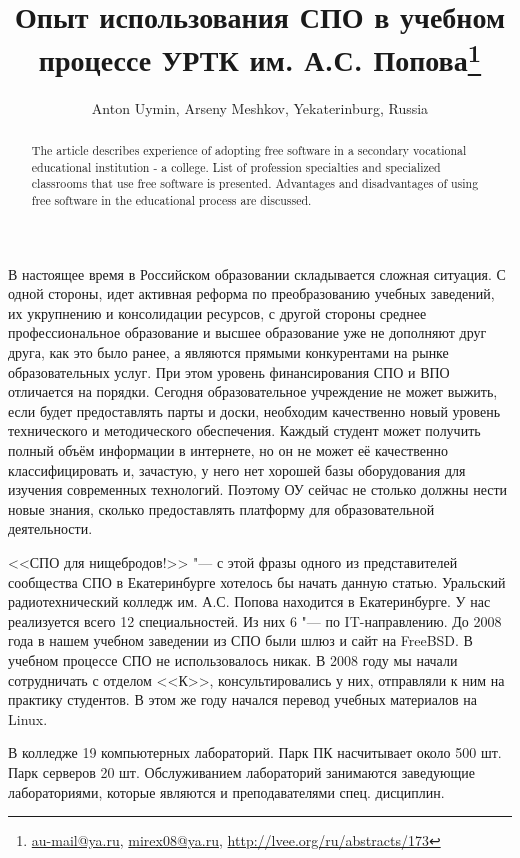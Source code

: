 \documentclass[10pt, a5paper]{article}
\begin{document}
\title{Опыт использования СПО в учебном процессе УРТК им. А.С. Попова\footnote{\url{au-mail@ya.ru}, \url{mirex08@ya.ru}, \url{http://lvee.org/ru/abstracts/173}}}
\author{Anton Uymin, Arseny Meshkov, Yekaterinburg, Russia}
\maketitle
\begin{abstract}
The article describes experience of adopting free software in a secondary vocational educational institution - a college. List of profession specialties and specialized classrooms that use free software is presented. Advantages and disadvantages of using free software in the educational process are discussed.
\end{abstract}
В настоящее время в Российском образовании складывается сложная ситуация. С одной стороны, идет активная реформа по преобразованию учебных заведений, их укрупнению и консолидации ресурсов, с другой стороны среднее профессиональное образование и высшее образование уже не дополняют друг друга, как это было ранее, а являются прямыми конкурентами на рынке образовательных услуг. При этом уровень финансирования СПО и ВПО отличается на порядки. Сегодня образовательное учреждение не может выжить, если будет предоставлять парты и доски, необходим качественно новый уровень технического и методического обеспечения. Каждый студент может получить полный объём информации в интернете, но он не может её качественно классифицировать и, зачастую, у него нет хорошей базы оборудования для изучения современных технологий. Поэтому ОУ сейчас не столько должны нести новые знания, сколько предоставлять платформу для образовательной деятельности.

<<СПО для нищебродов!>> "--- с этой фразы одного из представителей сообщества СПО в Екатеринбурге хотелось бы начать данную статью. Уральский радиотехнический колледж им. А.С. Попова находится в Екатеринбурге. У нас реализуется всего 12 специальностей. Из них 6 "--- по IT-направлению. До 2008 года в нашем учебном заведении из СПО были шлюз и сайт на FreeBSD. В учебном процессе СПО не использовалось никак. В 2008 году мы начали сотрудничать с отделом <<К>>, консультировались у них, отправляли к ним на практику студентов. В этом же году начался перевод учебных материалов на Linux.

В колледже 19 компьютерных лабораторий. Парк ПК насчитывает около 500 шт. Парк серверов 20 шт. Обслуживанием лабораторий занимаются заведующие лабораториями, которые являются и преподавателями спец. дисциплин.
\end{document}
